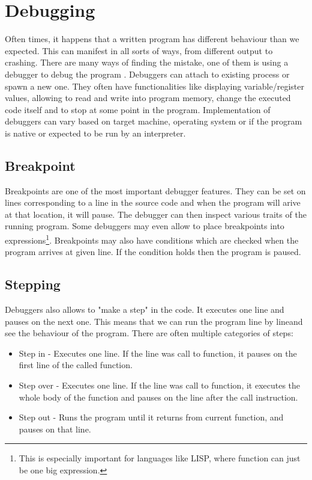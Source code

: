 \chapter{Debugging}
Often times, it happens that a written program has different behaviour than we expected. This can manifest in all sorts of ways, from different output to crashing. There are many ways of finding the mistake, one of them is using a debugger to debug the program \cite{software-debugging-testing-verification}.
Debuggers can attach to existing process or spawn a new one. They often have functionalities like displaying variable/register values, allowing to read and write into program memory, change the executed code itself and to stop at some point in the program. Implementation of debuggers can vary based on target machine, operating system or if the program is native or expected to be run by an interpreter.

\section{Breakpoint}\label{breakpoint}
Breakpoints are one of the most important debugger features. They can be set on lines corresponding to a line in the source code and when the program will arive at that location, it will pause. The debugger can then inspect various traits of the running program. Some debuggers may even allow to place breakpoints into expressions\footnote{This is especially important for languages like LISP, where function can just be one big expression.}. Breakpoints may also have conditions which are checked when the program arrives at given line. If the condition holds then the program is paused. 

\section{Stepping}
Debuggers also allows to "make a step" in the code. It executes one line and pauses on the next one. This means that we can run the program line by lineand see the behaviour of the program.
There are often multiple categories of steps:

\begin{itemize}
    \item Step in - Executes one line. If the line was call to function, it pauses on the first line of the called function.
    \item Step over - Executes one line. If the line was call to function, it executes the whole body of the function and pauses on the line after the call instruction.
    \item Step out - Runs the program until it returns from current function, and pauses on that line.
\end{itemize}

